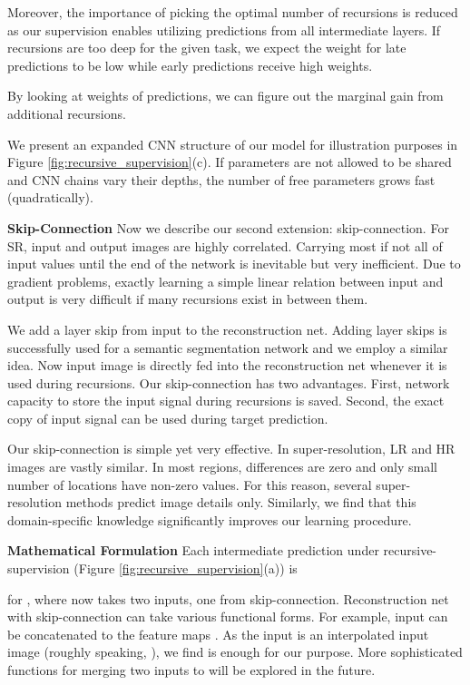 \documentclass[10pt,twocolumn,letterpaper]{article}
\begin{document}
Moreover, the importance of picking the optimal number of recursions is reduced as our supervision enables utilizing predictions from all intermediate layers. If recursions are too deep for the given task, we expect the weight for late predictions to be low while early predictions receive high weights. 


By looking at weights of predictions, we can figure out the marginal gain from additional recursions. 

We present an expanded CNN structure of our model for illustration purposes in Figure \ref{fig:recursive_supervision}(c). If parameters are not allowed to be shared and CNN chains vary their depths, the number of free parameters grows fast (quadratically).

\textbf{Skip-Connection} Now we describe our second extension: skip-connection. For SR, input and output images are highly correlated. Carrying most if not all of input values until the end of the network is inevitable but very inefficient. Due to gradient problems, exactly learning a simple linear relation between input and output is very difficult if many recursions exist in between them.  

We add a layer skip \cite{bishop2006pattern} from input to the reconstruction net. Adding layer skips is successfully used for a semantic segmentation network \cite{long2014fully} and we employ a similar idea. Now input image is directly fed into the reconstruction net whenever it is used during recursions. Our skip-connection has two advantages. First, network capacity to store the input signal during recursions is saved. Second, the exact copy of input signal can be used during target prediction. 

Our skip-connection is simple yet very effective. In super-resolution, LR and HR images are vastly similar. In most regions, differences are zero and only small number of locations have non-zero values. For this reason, several super-resolution methods \cite{Timofte2013, Timofte, bevilacqua2012,bevilacqua2013super} predict image details only. Similarly, we find that this domain-specific knowledge significantly improves our learning procedure. 

\textbf{Mathematical Formulation} Each intermediate prediction under recursive-supervision (Figure \ref{fig:recursive_supervision}(a)) is 

for , where  now takes two inputs, one from skip-connection. Reconstruction net with skip-connection can take various functional forms. For example, input can be concatenated to the feature maps . As the input is an interpolated input image (roughly speaking, ), we find  is enough for our purpose. More sophisticated functions for merging two inputs to  will be explored in the future. 
\end{document}
